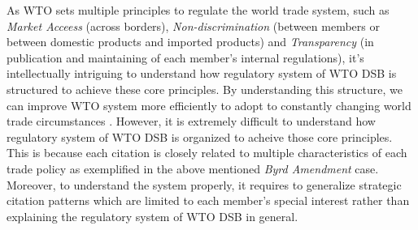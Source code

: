 As WTO sets multiple principles to regulate the world trade system, 
such as \textit{Market Acceess} (across borders), 
\textit{Non-discrimination} (between members 
or between domestic products and imported products) 
and \textit{Transparency} (in publication and maintaining 
of each member's internal regulations), 
it's intellectually intriguing 
to understand how regulatory system of WTO DSB
is structured to achieve these core principles.
By understanding this structure, 
we can improve WTO system more efficiently 
to adopt to constantly 
changing world trade circumstances
\citep{FREDEBEULKREIN1999625, shaffer_2004, 10.1093/jiel/jgm028}.
However, it is extremely difficult to 
understand how regulatory system of 
WTO DSB is organized to acheive 
those core principles. 
This is because each citation is closely related 
to multiple characteristics 
of each trade policy as exemplified in 
the above mentioned \textit{Byrd Amendment} case. 
Moreover, to understand the system properly, 
it requires to generalize strategic 
citation patterns which are limited 
to each member's special interest 
rather than explaining the 
regulatory system of WTO DSB in general.


